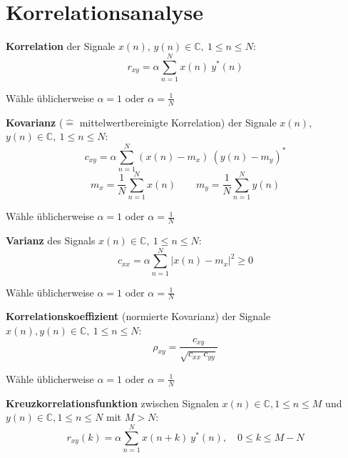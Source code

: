 \documentclass[10pt,a4paper]{article}
\begin{document}
\section*{Korrelationsanalyse}
\vspace{-1.5em}
\begin{multicols}{2}
	\begin{adjustbox}{valign=t,center=0.48\textwidth,margin=1ex,minipage=[t][][t]{0.43\textwidth},bgcolor=white,cfbox=black 1.5pt 0pt 1pt}
		\textbf{Korrelation} der Signale $x(n)$, $y(n) \in \mathbb C, ~ 1 \leq n \leq N$:
		\[ r_{xy} = \alpha \sum_{n = 1}^N x(n) ~ y^*(n) \]

		Wähle üblicherweise $\alpha = 1$ oder $\alpha = \frac{1}{N}$
	\end{adjustbox}

	\begin{adjustbox}{valign=t,center=0.48\textwidth,margin=1ex,minipage=[t][][t]{0.43\textwidth},bgcolor=white,cfbox=black 1.5pt 0pt 1pt}
		\textbf{Kovarianz} ($\hat =$ mittelwertbereinigte Korrelation) der Signale $x(n)$, $y(n) \in \mathbb C, ~ 1 \leq n \leq N$:
		\[ c_{xy} = \alpha \sum_{n = 1}^N (x(n) - m_x) ~ (y(n) - m_y)^* \]
		\[ m_x = \frac{1}{N} \sum_{n = 1}^N x(n) \qquad m_y = \frac{1}{N} \sum_{n = 1}^N y(n) \]

		Wähle üblicherweise $\alpha = 1$ oder $\alpha = \frac{1}{N}$
	\end{adjustbox}

	\begin{adjustbox}{valign=t,center=0.48\textwidth,margin=1ex,minipage=[t][][t]{0.43\textwidth},bgcolor=white,cfbox=black 1.5pt 0pt 1pt}
		\textbf{Varianz} des Signals $x(n) \in \mathbb C, ~ 1 \leq n \leq N$:
		\[ c_{xx} = \alpha \sum_{n = 1}^N \left| x(n) - m_x \right|^2 \geq 0 \]

		Wähle üblicherweise $\alpha = 1$ oder $\alpha = \frac{1}{N}$
	\end{adjustbox}

	\begin{adjustbox}{valign=t,center=0.48\textwidth,margin=1ex,minipage=[t][][t]{0.43\textwidth},bgcolor=white,cfbox=black 1.5pt 0pt 1pt}
		\textbf{Korrelationskoeffizient} (normierte Kovarianz) der Signale $x(n), y(n) \in \mathbb C, ~ 1 \leq n \leq N$:
		\[ \rho_{xy} = \frac{c_{xy}}{\sqrt{c_{xx} ~ c_{yy}}} \]

		Wähle üblicherweise $\alpha = 1$ oder $\alpha = \frac{1}{N}$
	\end{adjustbox}

	\begin{adjustbox}{valign=t,center=0.48\textwidth,margin=1ex,minipage=[t][][t]{0.43\textwidth},bgcolor=white,cfbox=black 1.5pt 0pt 1pt}
		\textbf{Kreuzkorrelationsfunktion} zwischen Signalen $x(n) \in \mathbb C, 1 \leq n \leq M$ und $y(n) \in \mathbb C, 1 \leq n \leq N$ mit $M > N$:
		\[ r_{xy}(k) = \alpha \sum_{n = 1}^N x(n + k) ~ y^*(n), \quad 0 \leq k \leq M - N \]


\end{adjustbox}
\end{multicols}
\end{document}
